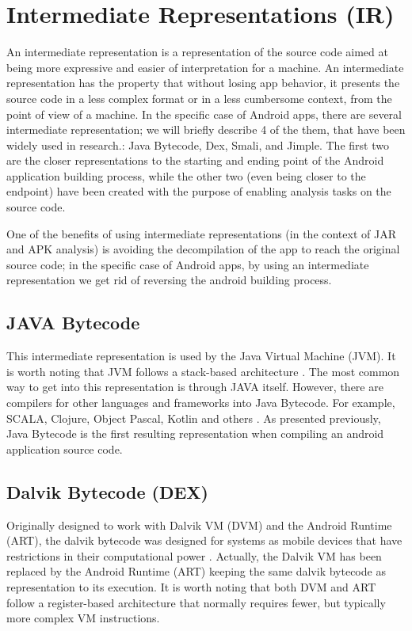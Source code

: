 \section{Intermediate Representations (IR)}

An intermediate representation is a representation of the source code aimed at being more expressive  and easier of interpretation for a machine. An intermediate representation has the property that without losing app behavior, it presents the source code in a less complex format or in a less cumbersome context, from the point of view of a machine. In the specific case of Android apps, there are several intermediate  representation; we will briefly describe 4  of the them, that have been widely used in research.:  Java Bytecode, Dex, Smali, and Jimple. The first two are the closer representations to the starting and ending point of the Android application building process, while the other two (even being closer to the endpoint) have been created with the purpose of enabling analysis tasks on the source code. 

One of the benefits of using intermediate representations (in the context of JAR and APK analysis) is avoiding the decompilation of the app to reach the original source code; in the specific case of Android apps, by using an intermediate representation we get rid of reversing the android building process.

\subsection{JAVA Bytecode}

This intermediate representation is used by the Java Virtual Machine (JVM). It is worth noting that JVM follows a stack-based architecture \cite{jvms}. The most common way to get into this representation is through JAVA itself. However, there are compilers for other languages and frameworks into Java Bytecode. For example, SCALA, Clojure, Object Pascal, Kotlin and others \cite{pljvm}. As presented previously, Java Bytecode is the first resulting representation when compiling an android application source code.

\subsection{Dalvik Bytecode (DEX)}

Originally designed to work with Dalvik VM (DVM) and the Android Runtime (ART), the dalvik bytecode was designed for systems as mobile devices that have restrictions in their computational power \cite{dvmi, jitcadvm}. Actually, the Dalvik VM has been replaced by the Android Runtime (ART) keeping the same dalvik bytecode as representation to its execution. It is worth noting  that both DVM and ART follow a register-based architecture that normally requires fewer, but typically more complex VM instructions.

